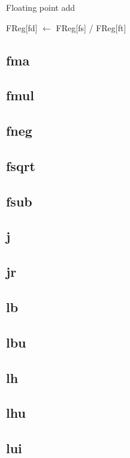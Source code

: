 Floating point add

FReg[fd] $\leftarrow$ FReg[fs] / FReg[ft]

\subsection*{fma}

\subsection*{fmul}

\subsection*{fneg}

\subsection*{fsqrt}

\subsection*{fsub}

\subsection*{j}

\subsection*{jr}

\subsection*{lb}

\subsection*{lbu}

\subsection*{lh}

\subsection*{lhu}

\subsection*{lui}

